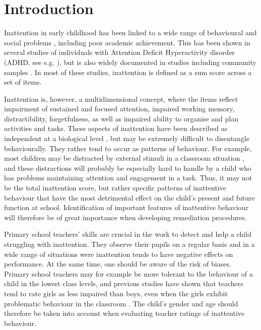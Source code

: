 \documentclass[10pt,letterpaper]{article}
\begin{document}
\linenumbers

\section*{Introduction}
Inattention in early childhood has been linked to a wide range of behavioural and social problems \cite{Bellanti2000, Connors2012},  including poor academic achievement. This has been shown in several studies of individuals with Attention Deficit Hyperactivity disorder 
(ADHD, see e.g. \cite{Lee2006, Owens2017}), but is also widely documented in studies including community samples \cite{Polderman2010, Metcalfe2013, Pingault2014, Garner2013, Holmberg2014, Gray2014, Salla2016}.  In most of these studies, inattention is defined as a sum score across a set of items.

Inattention is, however, a multidimensional concept,  where the items 
reflect impairment of sustained and focused attention, impaired working memory, distractibility, forgetfulness, as well as impaired ability to organise and plan activities and tasks. These aspects of inattention have been described as independent at a biological level  \cite{Berry2014}, but may be extremely difficult to disentangle behaviourally. They rather tend to occur as patterns of behaviour. For example, most children may be distracted by external stimuli in a classroom situation \cite{Rescorla2007}, and these distractions will probably be especially hard to handle by a child who has problems maintaining attention and engagement in a task. Thus, it may not be the total inattention score, but rather specific patterns of inattentive behaviour that have the most detrimental effect on the child's present and future function at school. Identification of important features of inattentive behaviour will therefore be of great importance when developing remediation procedures. 

Primary school teachers' skills are crucial in the work to detect and help a child struggling with inattention. They observe their pupils on a regular basis and in a wide range of situations were inattention tends to have negative effects on performance. At the same time, one should be aware of the risk of biases. Primary school teachers may for example be more tolerant to the behaviour of a child in the lowest class levels, and previous studies have shown that teachers tend to rate girls as less impaired than boys, even when the girls exhibit problematic behaviour in the classroom \cite{Becker2013, Bussing2003c, Ohan2009}. The child's gender and age should therefore be taken into account when evaluating teacher ratings of inattentive behaviour. \\
\end{document}
